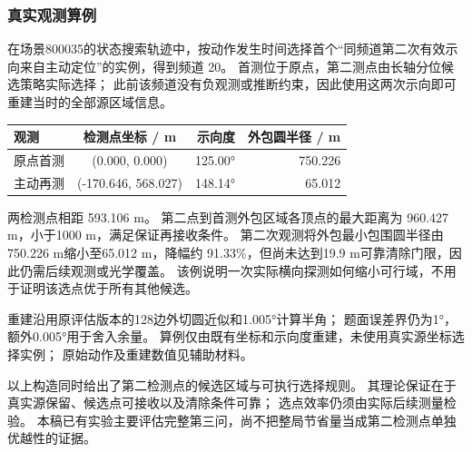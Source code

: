 \subsubsection{真实观测算例}\label{sec:q2-5}

在场景800035的状态搜索轨迹中，按动作发生时间选择首个``同频道第二次有效示向来自主动定位''的实例，得到频道 20。
首测位于原点，第二测点由长轴分位候选策略实际选择；
此前该频道没有负观测或推断约束，因此使用这两次示向即可重建当时的全部源区域信息。

\Needspace{38mm}
\begin{center}
\begin{minipage}{\linewidth}
\centering\small
{}
\label{tab:q2-example}
\vspace{4pt}
\begin{tabular}{@{}lcrr@{}}
\toprule
观测 & 检测点坐标 / m & 示向度 & 外包圆半径 / m \\
\midrule
原点首测 & (0.000, 0.000) & 125.00° & 750.226 \\
主动再测 & (-170.646, 568.027) & 148.14° & 65.012 \\
\bottomrule
\end{tabular}
\end{minipage}
\end{center}

两检测点相距 593.106 m。
第二点到首测外包区域各顶点的最大距离为 960.427 m，小于1000 m，满足保证再接收条件。
第二次观测将外包最小包围圆半径由750.226 m缩小至65.012 m，降幅约 91.33\%，但尚未达到19.9 m可靠清除门限，因此仍需后续观测或光学覆盖。
该例说明一次实际横向探测如何缩小可行域，不用于证明该选点优于所有其他候选。

重建沿用原评估版本的128边外切圆近似和1.005°计算半角；
题面误差界仍为1°，额外0.005°用于舍入余量。
算例仅由既有坐标和示向度重建，未使用真实源坐标选择实例；
原始动作及重建数值见辅助材料。

以上构造同时给出了第二检测点的候选区域与可执行选择规则。
其理论保证在于真实源保留、候选点可接收以及清除条件可靠；
选点效率仍须由实际后续测量检验。
本稿已有实验主要评估完整第三问，尚不把整局节省量当成第二检测点单独优越性的证据。


